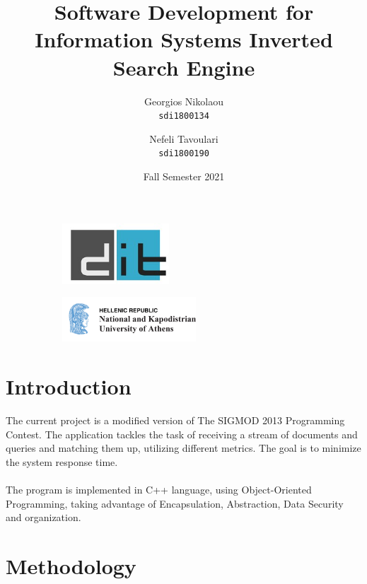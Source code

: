 \documentclass{article}
\title{%
\HUGE
Software Development for Information Systems \LARGE Inverted Search Engine}
\begin{document}
\author{\Large
  Georgios Nikolaou\\
   \texttt{\large sdi1800134}
  \and
  \Large
  Nefeli Tavoulari\\
   \texttt{\large sdi1800190}
}
\date{Fall Semester 2021}
\maketitle
\begin{figure}
\centering
\begin{subfigure}
  \centering
  \includegraphics[width=40mm]{dit_logo}
  \label{fig:sub1}
\end{subfigure}%
\begin{subfigure}
  \centering
  \includegraphics[width=50mm]{NKUA_logo}
  \label{fig:sub2}
\end{subfigure}
\label{fig:test}
\end{figure}


\newpage
\tableofcontents
\newpage
\section{Introduction} \large
The current project is a modified version of The SIGMOD 2013 Programming Contest.
The application tackles the task of receiving a stream of documents and queries and matching them up, utilizing different metrics.
The goal is to minimize the system response time. \\ \\
The program is implemented in C++ language, using Object-Oriented Programming, taking advantage of Encapsulation, Abstraction, Data Security and organization.
\section{Methodology}
\end{document}
